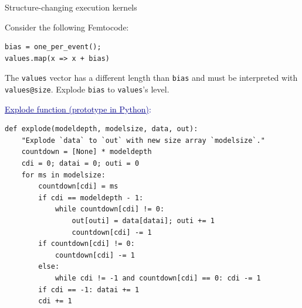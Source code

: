 \documentclass{beamer}
\begin{document}
\begin{frame}[fragile]{Structure-changing execution kernels}
\scriptsize

\vspace{0.25 cm}
Consider the following Femtocode:
\begin{center}
\begin{minipage}{0.5\linewidth}
\begin{verbatim}
bias = one_per_event();
values.map(x => x + bias)
\end{verbatim}
\end{minipage}
\end{center}

The {\tt values} vector has a different length than {\tt bias} and must be interpreted with {\tt values@size}. Explode {\tt bias} to {\tt values}'s level.

\vspace{0.25 cm}
\textcolor{darkblue}{\small \underline{Explode function (prototype in Python)}:}
\begin{verbatim}
def explode(modeldepth, modelsize, data, out):
    "Explode `data` to `out` with new size array `modelsize`."
    countdown = [None] * modeldepth
    cdi = 0; datai = 0; outi = 0
    for ms in modelsize:
        countdown[cdi] = ms
        if cdi == modeldepth - 1:
            while countdown[cdi] != 0:
                out[outi] = data[datai]; outi += 1
                countdown[cdi] -= 1
        if countdown[cdi] != 0:
            countdown[cdi] -= 1
        else:
            while cdi != -1 and countdown[cdi] == 0: cdi -= 1
        if cdi == -1: datai += 1
        cdi += 1
\end{verbatim}
\end{frame}
\end{document}
